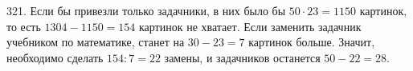 321. Если бы привезли только задачники, в них было бы $50\cdot23=1150$ картинок, то есть $1304-1150=154$ картинок не хватает. Если заменить задачник учебником по математике, станет на $30-23=7$ картинок больше. Значит, необходимо сделать $154:7=22$ замены, и задачников останется $50-22=28.$\\
